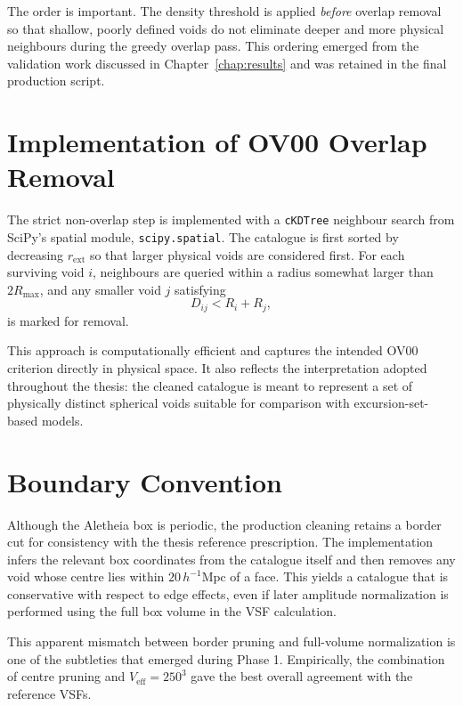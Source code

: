 \documentclass[12pt]{report}
\begin{document}
The order is important. The density threshold is applied \emph{before} overlap removal so that shallow, poorly defined voids do not eliminate deeper and more physical neighbours during the greedy overlap pass. This ordering emerged from the validation work discussed in Chapter~\ref{chap:results} and was retained in the final production script.

\section{Implementation of OV00 Overlap Removal}

The strict non-overlap step is implemented with a \texttt{cKDTree} neighbour search from SciPy's spatial module, \texttt{scipy.spatial}. The catalogue is first sorted by decreasing $r_\mathrm{ext}$ so that larger physical voids are considered first. For each surviving void $i$, neighbours are queried within a radius somewhat larger than $2R_\mathrm{max}$, and any smaller void $j$ satisfying
\begin{equation}
    D_{ij} < R_i + R_j,
\end{equation}
is marked for removal.

This approach is computationally efficient and captures the intended OV00 criterion directly in physical space. It also reflects the interpretation adopted throughout the thesis: the cleaned catalogue is meant to represent a set of physically distinct spherical voids suitable for comparison with excursion-set-based models.

\section{Boundary Convention}

Although the Aletheia box is periodic, the production cleaning retains a border cut for consistency with the thesis reference prescription. The implementation infers the relevant box coordinates from the catalogue itself and then removes any void whose centre lies within $20\,h^{-1}\mathrm{Mpc}$ of a face. This yields a catalogue that is conservative with respect to edge effects, even if later amplitude normalization is performed using the full box volume in the VSF calculation.

This apparent mismatch between border pruning and full-volume normalization is one of the subtleties that emerged during Phase 1. Empirically, the combination of centre pruning and $V_\mathrm{eff}=250^3$ gave the best overall agreement with the reference VSFs.
\end{document}
